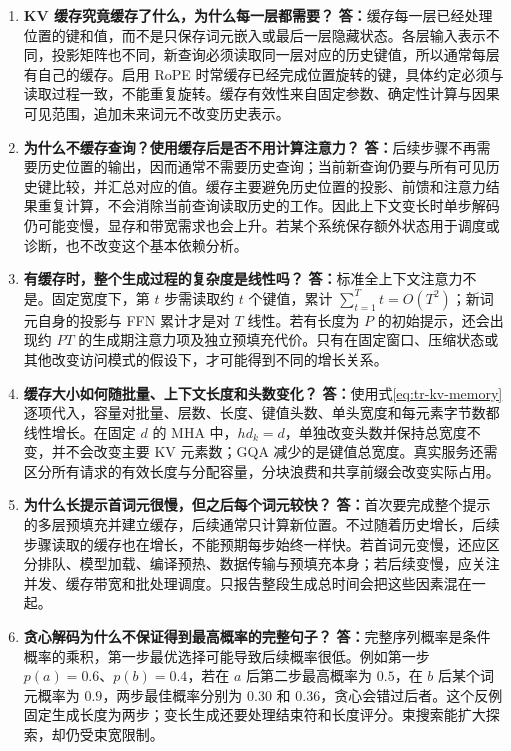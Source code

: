 \documentclass[UTF8,12pt,a4paper,fontset=fandol]{ctexart}
\begin{document}
\begin{enumerate}[resume*=trquestions]
\item \textbf{KV 缓存究竟缓存了什么，为什么每一层都需要？}
\textbf{答：}缓存每一层已经处理位置的键和值，而不是只保存词元嵌入或最后一层隐藏状态。各层输入表示不同，投影矩阵也不同，新查询必须读取同一层对应的历史键值，所以通常每层有自己的缓存。启用 RoPE 时常缓存已经完成位置旋转的键，具体约定必须与读取过程一致，不能重复旋转。缓存有效性来自固定参数、确定性计算与因果可见范围，追加未来词元不改变历史表示。

\item \textbf{为什么不缓存查询？使用缓存后是否不用计算注意力？}
\textbf{答：}后续步骤不再需要历史位置的输出，因而通常不需要历史查询；当前新查询仍要与所有可见历史键比较，并汇总对应的值。缓存主要避免历史位置的投影、前馈和注意力结果重复计算，不会消除当前查询读取历史的工作。因此上下文变长时单步解码仍可能变慢，显存和带宽需求也会上升。若某个系统保存额外状态用于调度或诊断，也不改变这个基本依赖分析。

\item \textbf{有缓存时，整个生成过程的复杂度是线性吗？}
\textbf{答：}标准全上下文注意力不是。固定宽度下，第 $t$ 步需读取约 $t$ 个键值，累计 $\sum_{t=1}^{T}t=O(T^2)$；新词元自身的投影与 FFN 累计才是对 $T$ 线性。若有长度为 $P$ 的初始提示，还会出现约 $PT$ 的生成期注意力项及独立预填充代价。只有在固定窗口、压缩状态或其他改变访问模式的假设下，才可能得到不同的增长关系。

\item \textbf{缓存大小如何随批量、上下文长度和头数变化？}
\textbf{答：}使用式\eqref{eq:tr-kv-memory}逐项代入，容量对批量、层数、长度、键值头数、单头宽度和每元素字节数都线性增长。在固定 $d$ 的 MHA 中，$hd_k=d$，单独改变头数并保持总宽度不变，并不会改变主要 KV 元素数；GQA 减少的是键值总宽度。真实服务还需区分所有请求的有效长度与分配容量，分块浪费和共享前缀会改变实际占用。

\item \textbf{为什么长提示首词元很慢，但之后每个词元较快？}
\textbf{答：}首次要完成整个提示的多层预填充并建立缓存，后续通常只计算新位置。不过随着历史增长，后续步骤读取的缓存也在增长，不能预期每步始终一样快。若首词元变慢，还应区分排队、模型加载、编译预热、数据传输与预填充本身；若后续变慢，应关注并发、缓存带宽和批处理调度。只报告整段生成总时间会把这些因素混在一起。

\item \textbf{贪心解码为什么不保证得到最高概率的完整句子？}
\textbf{答：}完整序列概率是条件概率的乘积，第一步最优选择可能导致后续概率很低。例如第一步 $p(a)=0.6$、$p(b)=0.4$，若在 $a$ 后第二步最高概率为 $0.5$，在 $b$ 后某个词元概率为 $0.9$，两步最佳概率分别为 $0.30$ 和 $0.36$，贪心会错过后者。这个反例固定生成长度为两步；变长生成还要处理结束符和长度评分。束搜索能扩大探索，却仍受束宽限制。


\end{enumerate}
\end{document}
